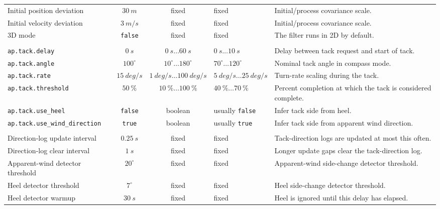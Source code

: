 \documentclass[10pt,twocolumn]{article}
\begin{document}
\begin{table}[!tbp]
\begin{tabularx}{\textwidth}{Z{0.23\textwidth}c c Z{0.16\textwidth}Y}
Initial position deviation & \(\SI{30}{m}\) & fixed & fixed & Initial/process covariance scale. \\
Initial velocity deviation & \(\SI{3}{m/s}\) & fixed & fixed & Initial/process covariance scale. \\
3D mode & \texttt{false} & fixed & fixed & The filter runs in 2D by default. \\
\addlinespace[0.6ex]
 \\
\addlinespace[0.25ex]
\texttt{ap.tack.delay} & \(\SI{0}{s}\) & \(\SI{0}{s}\ldots\SI{60}{s}\) & \(\SI{0}{s}\ldots\SI{10}{s}\) & Delay between tack request and start of tack. \\
\texttt{ap.tack.angle} & \(100^\circ\) & \(10^\circ\ldots180^\circ\) & \(70^\circ\ldots120^\circ\) & Nominal tack angle in compass mode. \\
\texttt{ap.tack.rate} & \(\SI{15}{deg/s}\) & \(\SI{1}{deg/s}\ldots\SI{100}{deg/s}\) & \(\SI{5}{deg/s}\ldots\SI{25}{deg/s}\) & Turn-rate scaling during the tack. \\
\texttt{ap.tack.threshold} & \(\SI{50}{\percent}\) & \(\SI{10}{\percent}\ldots\SI{100}{\percent}\) & \(\SI{40}{\percent}\ldots\SI{70}{\percent}\) & Percent completion at which the tack is considered complete. \\
\texttt{ap.tack.use\_heel} & \texttt{false} & boolean & usually \texttt{false} & Infer tack side from heel. \\
\texttt{ap.tack.use\_wind\_direction} & \texttt{true} & boolean & usually \texttt{true} & Infer tack side from apparent wind direction. \\
\addlinespace[0.6ex]
 \\
\addlinespace[0.25ex]
Direction-log update interval & \(\SI{0.25}{s}\) & fixed & fixed & Tack-direction logs are updated at most this often. \\
Direction-log clear interval & \(\SI{1}{s}\) & fixed & fixed & Longer update gaps clear the tack-direction log. \\
Apparent-wind detector threshold & \(20^\circ\) & fixed & fixed & Apparent-wind side-change detector threshold. \\
Heel detector threshold & \(7^\circ\) & fixed & fixed & Heel side-change detector threshold. \\
Heel detector warmup & \(\SI{30}{s}\) & fixed & fixed & Heel is ignored until this delay has elapsed. \\
\bottomrule
\end{tabularx}
\end{table}
\end{document}
